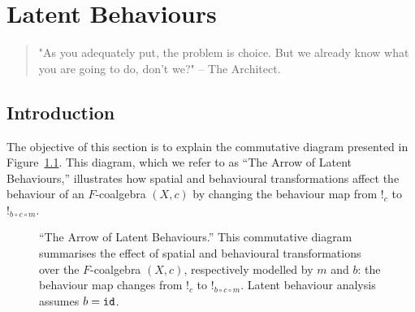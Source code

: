 

\chapter{Latent Behaviours} %
\label{ch:LatentBehaviours} %
\begin{quote} 
"As you adequately put, the problem is choice. But we already know what you are going to do, don't we?" -- The Architect.
\end{quote} 

\section{Introduction}
The objective of this section is to explain the commutative diagram presented in Figure~\ref{fig:TheArrow}. This diagram, which we refer to as ``The Arrow of Latent Behaviours,'' illustrates how spatial and behavioural transformations affect the behaviour of an $F$-coalgebra $(X,c)$ by changing the behaviour map from $!_c$ to $!_{b\circ c\circ m}$. 

\begin{figure}[h]
        \centering
        \caption{``The Arrow of Latent Behaviours.'' This commutative diagram summarises the effect of spatial and behavioural transformations over the $F$-coalgebra $(X,c)$, respectively modelled by $m$ and $b$: the behaviour map changes from $!_c$ to $!_{b\circ c\circ m}$. Latent behaviour analysis assumes $b={\texttt{id}}$.}
        \label{fig:TheArrow} 
    \end{figure}

